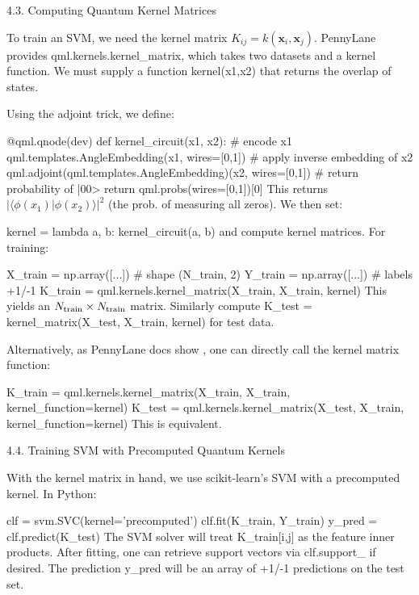 4.3. Computing Quantum Kernel Matrices





To train an SVM, we need the kernel matrix $K_{ij}=k(\mathbf{x}_i,\mathbf{x}_j)$.  PennyLane provides qml.kernels.kernel_matrix, which takes two datasets and a kernel function.  We must supply a function kernel(x1,x2) that returns the overlap of states.



Using the adjoint trick, we define:

@qml.qnode(dev)
def kernel_circuit(x1, x2):
    # encode x1
    qml.templates.AngleEmbedding(x1, wires=[0,1])
    # apply inverse embedding of x2
    qml.adjoint(qml.templates.AngleEmbedding)(x2, wires=[0,1])
    # return probability of |00>
    return qml.probs(wires=[0,1])[0]
This returns $|\langle \phi(x_1)|\phi(x_2)\rangle|^2$ (the prob. of measuring all zeros).  We then set:

kernel = lambda a, b: kernel_circuit(a, b)
and compute kernel matrices.  For training:

X_train = np.array([...])  # shape (N_train, 2)
Y_train = np.array([...])  # labels +1/-1
K_train = qml.kernels.kernel_matrix(X_train, X_train, kernel)
This yields an $N_{\rm train}\times N_{\rm train}$ matrix.  Similarly compute K_test = kernel_matrix(X_test, X_train, kernel) for test data.



Alternatively, as PennyLane docs show , one can directly call the kernel matrix function:

K_train = qml.kernels.kernel_matrix(X_train, X_train, kernel_function=kernel)
K_test = qml.kernels.kernel_matrix(X_test, X_train, kernel_function=kernel)
This is equivalent.





4.4. Training SVM with Precomputed Quantum Kernels





With the kernel matrix in hand, we use scikit-learn’s SVM with a precomputed kernel.  In Python:

clf = svm.SVC(kernel='precomputed')
clf.fit(K_train, Y_train)
y_pred = clf.predict(K_test)
The SVM solver will treat K_train[i,j] as the feature inner products.  After fitting, one can retrieve support vectors via clf.support_ if desired.  The prediction y_pred will be an array of +1/-1 predictions on the test set.



